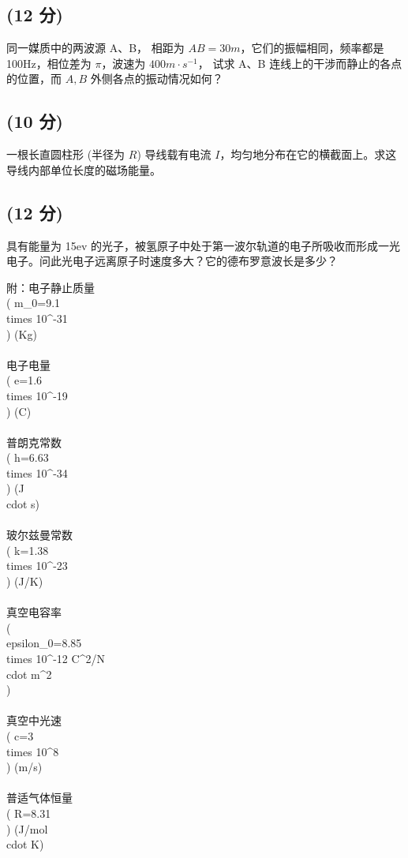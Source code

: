 \subsection{(12 分)}
同一媒质中的两波源 A、B， 相距为 \( AB=30m \)，它们的振幅相同，频率都是 100Hz，相位差为 \( \pi \)，波速为 \( 400m \cdot s^{-1} \)， 试求 A、B 连线上的干涉而静止的各点的位置，而 \(A,B\) 外侧各点的振动情况如何？
\subsection{(10 分)}
一根长直圆柱形 (半径为 \( R\)) 导线载有电流 \( I \)，均匀地分布在它的横截面上。求这导线内部单位长度的磁场能量。
\subsection{(12 分)}
具有能量为 15ev 的光子，被氢原子中处于第一波尔轨道的电子所吸收而形成一光电子。问此光电子远离原子时速度多大？它的德布罗意波长是多少？

附：电子静止质量 \\( m_0=9.1 \\times 10^{-31} \\) (Kg) \\\\
电子电量 \\( e=1.6 \\times 10^{-19} \\) (C) \\\\
普朗克常数 \\( h=6.63 \\times 10^{-34} \\) (J \\cdot s) \\\\
玻尔兹曼常数 \\( k=1.38 \\times 10^{-23} \\) (J/K) \\\\
真空电容率 \\( \\epsilon_0=8.85 \\times 10^{-12} C^2/N \\cdot m^2 \\) \\\\
真空中光速 \\( c=3 \\times 10^8 \\) (m/s) \\\\
普适气体恒量 \\( R=8.31 \\) (J/mol \\cdot K)